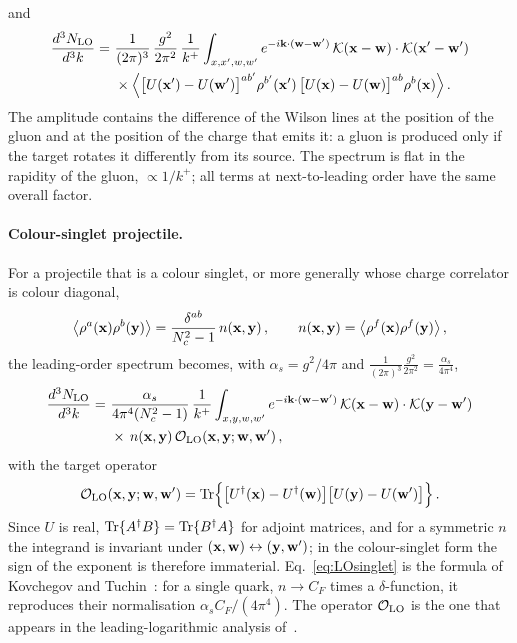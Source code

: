 and
\begin{align}\label{eq:LO}
\frac{d^3N_{\rm LO}}{d^3k}=\ &\frac{1}{(2\pi)^3}\,\frac{g^2}{2\pi^2}\,\frac{1}{k^+}\int_{x,x',w,w'}e^{-i\v k\cdot(\v w-\v w')}\,
\Kv(\v x-\v w)\cdot\Kv(\v x'-\v w')
\notag\\&\times
\Big\langle\big[U(\v x')-U(\v w')\big]^{ab'}\rho^{b'}(\v x')\,\big[U(\v x)-U(\v w)\big]^{ab}\rho^{b}(\v x)\Big\rangle\,.
\end{align}
The amplitude contains the difference of the Wilson lines at the position of the gluon and at the position of the charge that emits it: a gluon is produced only if the target rotates it differently from its source. The spectrum is flat in the rapidity of the gluon, $\propto1/k^+$; all terms at next-to-leading order have the same overall factor.

\paragraph{Colour-singlet projectile.} For a projectile that is a colour singlet, or more generally whose charge correlator is colour diagonal,
\begin{align}\label{eq:singlet}
\big\langle\rho^a(\mathbf{x})\rho^b(\mathbf{y})\big\rangle=\frac{\delta^{ab}}{N_c^2-1}\,n(\mathbf{x},\mathbf{y})\,,\qquad n(\mathbf{x},\mathbf{y})=\big\langle\rho^f(\mathbf{x})\rho^f(\mathbf{y})\big\rangle\,,
\end{align}
the leading-order spectrum becomes, with $\alpha_s=g^2/4\pi$ and $\frac{1}{(2\pi)^3}\frac{g^2}{2\pi^2}=\frac{\alpha_s}{4\pi^4}$,
\begin{align}\label{eq:LOsinglet}
\frac{d^3N_{\rm LO}}{d^3k}=\ &\frac{\alpha_s}{4\pi^4(N_c^2-1)}\,\frac{1}{k^+}\int_{x,y,w,w'}e^{-i\v k\cdot(\v w-\v w')}\,\Kv(\v x-\v w)\cdot\Kv(\v y-\v w')
\notag\\&\times\,n(\v x,\v y)\,
\mathcal O_{\rm LO}(\v x,\v y;\v w,\v w')\,,
\end{align}
with the target operator
\begin{align}\label{eq:OLO}
\mathcal O_{\rm LO}(\mathbf{x},\mathbf{y};\mathbf{w},\mathbf{w}')={\rm Tr}\Big\{\big[U^\dagger(\mathbf{x})-U^\dagger(\mathbf{w})\big]\big[U(\mathbf{y})-U(\mathbf{w}')\big]\Big\}\,.
\end{align}
Since $U$ is real, ${\rm Tr}\{A^\dagger B\}={\rm Tr}\{B^\dagger A\}$ for adjoint matrices, and for a symmetric $n$ the integrand is invariant under $(\mathbf{x},\mathbf{w})\leftrightarrow(\mathbf{y},\mathbf{w}')$; in the colour-singlet form the sign of the exponent is therefore immaterial. Eq.~\eqref{eq:LOsinglet} is the formula of Kovchegov and Tuchin~\cite{Kovchegov:2001sc}: for a single quark, $n\to C_F$ times a $\delta$-function, it reproduces their normalisation $\alpha_sC_F/(4\pi^4)$. The operator $\mathcal O_{\rm LO}$ is the one that appears in the leading-logarithmic analysis of~\cite{Kovner:2006wr,Kovner:2006ge}.

